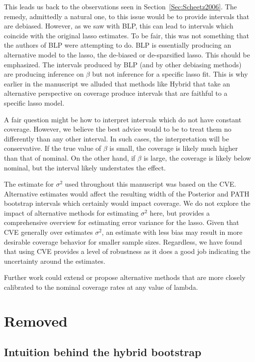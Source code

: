 This leads us back to the observations seen in Section~\ref{Sec:Scheetz2006}. The remedy, admittedly a natural one, to this issue would be to provide intervals that are debiased. However, as we saw with BLP, this can lead to intervals which coincide with the original lasso estimates. To be fair, this was not something that the authors of BLP were attempting to do. BLP is essentially producing an alternative model to the lasso, the de-biased or de-sparsified lasso. This should be emphasized. The intervals produced by BLP (and by other debiasing methods) are producing inference on $\beta$ but not inference for a specific lasso fit. This is why earlier in the manuscript we alluded that methods like Hybrid that take an alternative perspective on coverage produce intervals that are faithful to a specific lasso model.

A fair question might be how to interpret intervals which do not have constant coverage. However, we believe the best advice would to be to treat them no differently than any other interval. In such cases, the interpretation will be conservative. If the true value of $\beta$ is small, the coverage is likely much higher than that of nominal. On the other hand, if $\beta$ is large, the coverage is likely below nominal, but the interval likely understates the effect.

The estimate for $\sigma^2$ used throughout this manuscript was based on the CVE. Alternative estimates would affect the resulting width of the Posterior and PATH bootstrap intervals which certainly would impact coverage. We do not explore the impact of alternative methods for estimating $\sigma^2$ here, but \cite{Reid2016} provides a comprehensive overview for estimating error variance for the lasso. Given that CVE generally over estimates $\sigma^2$, an estimate with less bias may result in more desirable coverage behavior for smaller sample sizes. Regardless, we have found that using CVE provides a level of robustness as it does a good job indicating the uncertainty around the estimates.

Further work could extend or propose alternative methods that are more closely calibrated to the nominal coverage rates at any value of lambda.

\section{Removed}

\subsection{Intuition behind the hybrid bootstrap}

